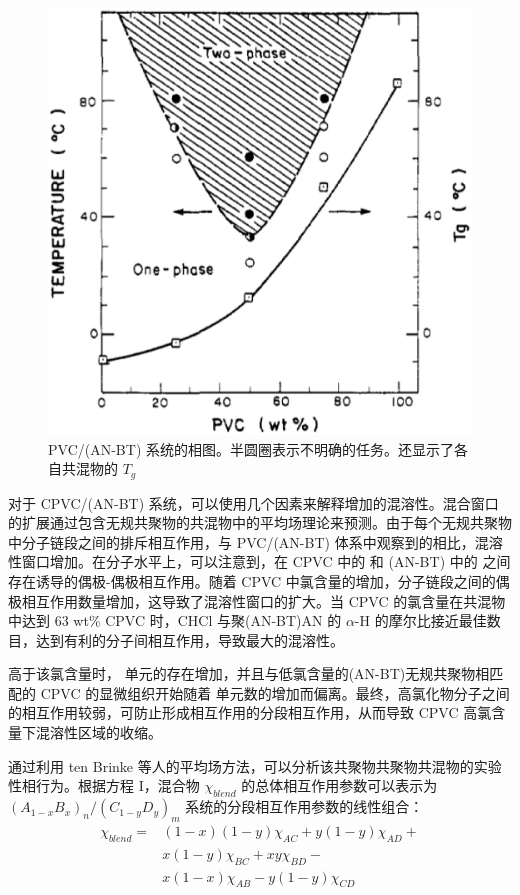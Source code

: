 \documentclass[a4paper,transmag,12pt]{IEEEtran}    %
\begin{document}
\begin{figure}[htb]
    \includegraphics[width=.9\linewidth]{src/figure4.eps}
    \caption{PVC/(AN-BT) 系统的相图。半圆圈表示不明确的任务。还显示了各自共混物的 $T_g$} 
\end{figure}

对于 CPVC/(AN-BT) 系统，可以使用几个因素来解释增加的混溶性。混合窗口的扩展通过包含无规共聚物的共混物中的平均场理论来预测。由于每个无规共聚物中分子链段之间的排斥相互作用，与 PVC/(AN-BT) 体系中观察到的相比，混溶性窗口增加。在分子水平上，可以注意到，在 CPVC 中的  和 (AN-BT) 中的  之间存在诱导的偶极-偶极相互作用。随着 CPVC 中氯含量的增加，分子链段之间的偶极相互作用数量增加，这导致了混溶性窗口的扩大。当 CPVC 的氯含量在共混物中达到 63 wt\% CPVC 时，CHCl 与聚(AN-BT)AN 的 $\alpha$-H 的摩尔比接近最佳数目，达到有利的分子间相互作用，导致最大的混溶性。\par{}
高于该氯含量时， 单元的存在增加，并且与低氯含量的(AN-BT)无规共聚物相匹配的 CPVC 的显微组织开始随着  单元数的增加而偏离。最终，高氯化物分子之间的相互作用较弱，可防止形成相互作用的分段相互作用，从而导致 CPVC 高氯含量下混溶性区域的收缩。\par{}
通过利用 ten Brinke 等人的平均场方法，可以分析该共聚物共聚物共混物的实验性相行为。根据方程 I，混合物 $\chi_{blend}$ 的总体相互作用参数可以表示为 $(A_{1-x}B_x)_n/(C_{1-y}D_y)_m$ 系统的分段相互作用参数的线性组合：
\begin{equation}
    \begin{aligned}
        \chi_{blend} = &(1-x)(1-y)\chi_{AC} + y(1-y)\chi_{AD} + \\
                        &x(1-y)\chi_{BC} + xy\chi_{BD} -    \\
                        &x(1-x)\chi_{AB} - y(1-y)\chi_{CD}
    \end{aligned}
\end{equation}
\end{document}
